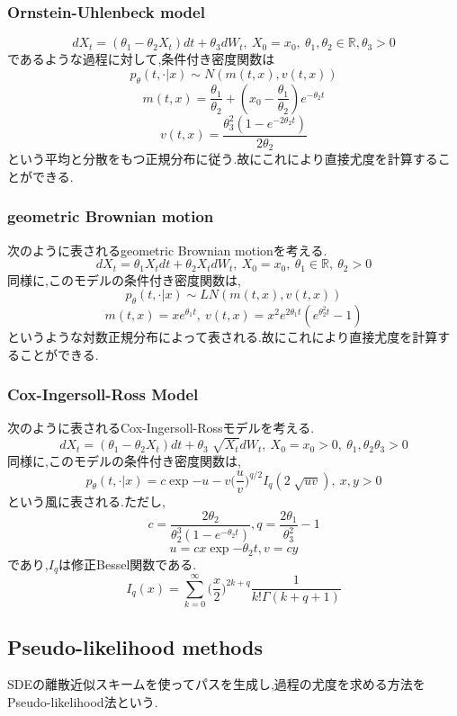 \documentclass[a4paper,dvipdfmx]{jreport}
\numberwithin{equation}{section}
\def\R{\mathbb R}
\begin{document}
\subsubsection{Ornstein-Uhlenbeck model}
\[
dX_t = (\theta_1 - \theta_2 X_t )  dt + \theta_3 dW_t ,\  X_0=x_0, \ \theta_1,\theta_2\in \R,\theta_3>0
\]
であるような過程に対して,条件付き密度関数は
\[
p_\theta(t,\cdot | x) \sim N(m(t,x),v(t,x))
\]
\[
m(t,x) = \frac{\theta_1}{\theta_2} + (x_0 -\frac{\theta_1}{\theta_2} ) e^{-\theta_2 t}
\]
\[
v(t,x) = \frac{\theta_3^2(1-e^{-2\theta_2 t})}{2\theta_2} 
\]
という平均と分散をもつ正規分布に従う.故にこれにより直接尤度を計算することができる.

\subsubsection{geometric Brownian motion}
次のように表されるgeometric Brownian motionを考える.
\[
dX_t = \theta_1 X_t dt + \theta_2 X_t dW_t , \ X_0 = x_0 ,\ \theta_1 \in \R,\ \theta_2 >0
\]
同様に,このモデルの条件付き密度関数は,
\[
p_\theta (t,\cdot | x)  \sim LN(m(t,x),v(t,x))
\]
\[
m(t,x)=xe^{\theta_1 t},\ v(t,x)=x^2 e^{2\theta_1 t} (e^{\theta_2^2 t} -1)
\]
というような対数正規分布によって表される.故にこれにより直接尤度を計算することができる.

\subsubsection{Cox-Ingersoll-Ross Model}
次のように表されるCox-Ingersoll-Rossモデルを考える.
\[
dX_t = (\theta_1 - \theta_2 X_t )  dt + \theta_3 \sqrt[]{X_t} dW_t ,\  X_0=x_0>0, \ \theta_1,\theta_2 \theta_3>0
\]
同様に,このモデルの条件付き密度関数は,
\[
p_\theta (t,\cdot | x) = c\exp{-u-v} \biggl(\frac{u}{v}\biggl)^{q/2} I_q(2\sqrt[]{uv}),\ x,y>0
\]
という風に表される.ただし,
\[
c = \frac{2\theta_2}{\theta_2^3(1-e^{-\theta_2 t})} , q= \frac{2\theta_1}{\theta_3^2} -1
\]
\[
u = cx\exp{-\theta_2 t} , v = cy
\]
であり,$I_q$は修正Bessel関数である.
\[
I_q(x)= \sum_{k=0}^\infty \biggl( \frac{x}{2}\biggl)^{2k+q} \frac{1}{k! \Gamma(k+q+1)}
\]
\subsection{Pseudo-likelihood methods}
SDEの離散近似スキームを使ってパスを生成し,過程の尤度を求める方法をPseudo-likelihood法という.
\end{document}

